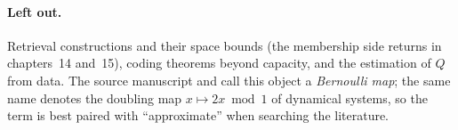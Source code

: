 \paragraph{Left out.}
Retrieval constructions and their space bounds (the membership side returns in
chapters~14 and~15), coding theorems beyond capacity, and the estimation of $Q$
from data. The source manuscript and  call this
object a \emph{Bernoulli map}; the same name denotes the
doubling map $x \mapsto 2x \bmod 1$ of dynamical systems, so the term is best
paired with ``approximate'' when searching the literature.

